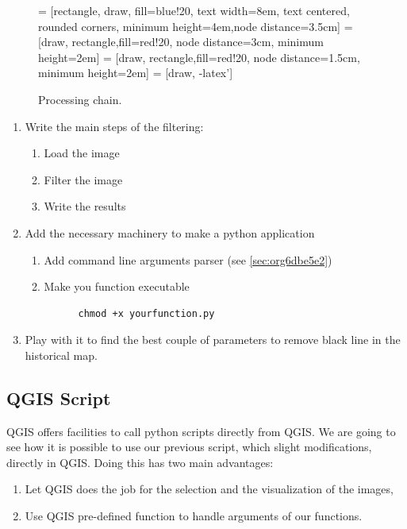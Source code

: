 \documentclass[a4paper,11pt,DIV=18]{scrartcl}
\begin{document}
\begin{figure}
 = [rectangle, draw, fill=blue!20, text width=8em, text centered, rounded corners, minimum height=4em,node distance=3.5cm]
   = [draw, rectangle,fill=red!20, node distance=3cm, minimum height=2em]
   = [draw, rectangle,fill=red!20, node distance=1.5cm, minimum height=2em]
   = [draw, -latex']
\caption{\label{org956b872}
Processing chain.}
\end{figure}

\begin{work}
\begin{enumerate}
\item Write the main steps of the filtering:
\begin{enumerate}
\item Load the image
\item Filter the image
\item Write the results
\end{enumerate}
\item Add the necessary machinery to make a python application
\begin{enumerate}
\item Add command line arguments parser (see \ref{sec:org6dbe5e2})
\item Make you function executable

\begin{verbatim}
      chmod +x yourfunction.py      
\end{verbatim}
\end{enumerate}
\item Play with it to find the best couple of parameters to remove black line in the historical map.
\end{enumerate}
\end{work}
\subsection{QGIS Script}
\label{sec:org9b9d2db}
QGIS offers facilities  to call python scripts directly  from QGIS. We
are going to see how it is  possible to use our previous script, which
slight  modifications,  directly in  QGIS.  Doing  this has  two  main
advantages:
\begin{enumerate}
\item Let QGIS does the job for the selection and the visualization of
the images,
\item Use QGIS pre-defined function to handle arguments of our functions.
\end{enumerate}
\end{document}
